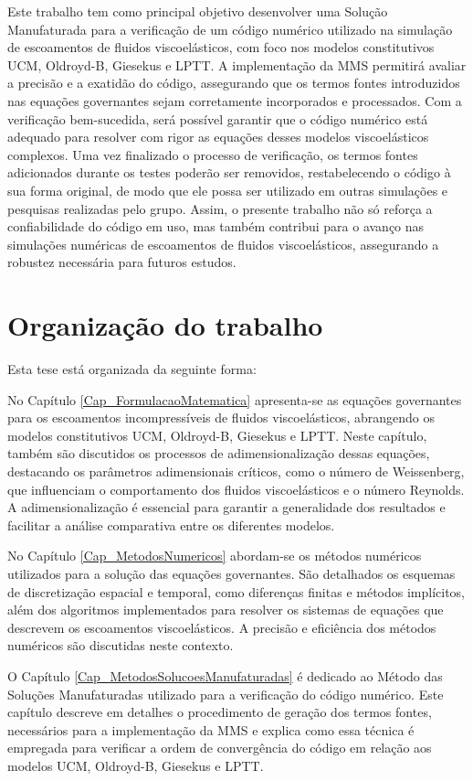 Este trabalho tem como principal objetivo desenvolver uma Solução Manufaturada para a verificação de um código numérico utilizado na simulação de escoamentos de fluidos viscoelásticos, com foco nos modelos constitutivos UCM, Oldroyd-B, Giesekus e LPTT. A implementação da MMS permitirá avaliar a precisão e a exatidão do código, assegurando que os termos fontes introduzidos nas equações governantes sejam corretamente incorporados e processados. Com a verificação bem-sucedida, será possível garantir que o código numérico está adequado para resolver com rigor as equações desses modelos viscoelásticos complexos. Uma vez finalizado o processo de verificação, os termos fontes adicionados durante os testes poderão ser removidos, restabelecendo o código à sua forma original, de modo que ele possa ser utilizado em outras simulações e pesquisas realizadas pelo grupo. Assim, o presente trabalho não só reforça a confiabilidade do código em uso, mas também contribui para o avanço nas simulações numéricas de escoamentos de fluidos viscoelásticos, assegurando a robustez necessária para futuros estudos.

\section{Organização do trabalho}
Esta tese está organizada da seguinte forma:

No Capítulo \ref{Cap_FormulacaoMatematica} apresenta-se as equações governantes para os escoamentos incompressíveis de fluidos viscoelásticos, abrangendo os modelos constitutivos UCM, Oldroyd-B, Giesekus e LPTT. Neste capítulo, também são discutidos os processos de adimensionalização dessas equações, destacando os parâmetros adimensionais críticos, como o número de Weissenberg, que influenciam o comportamento dos fluidos viscoelásticos e o número Reynolds. A adimensionalização é essencial para garantir a generalidade dos resultados e facilitar a análise comparativa entre os diferentes modelos.

No Capítulo \autoref{Cap_MetodosNumericos} abordam-se os métodos numéricos utilizados para a solução das equações governantes. São detalhados os esquemas de discretização espacial e temporal, como diferenças finitas e métodos implícitos, além dos algoritmos implementados para resolver os sistemas de equações que descrevem os escoamentos viscoelásticos. A precisão e eficiência dos métodos numéricos são discutidas neste contexto.

O Capítulo \ref{Cap_MetodosSolucoesManufaturadas} é dedicado ao Método das Soluções Manufaturadas utilizado para a verificação do código numérico. Este capítulo descreve em detalhes o procedimento de geração dos termos fontes, necessários para a implementação da MMS e explica como essa técnica é empregada para verificar a ordem de convergência do código em relação aos modelos UCM, Oldroyd-B, Giesekus e LPTT.

